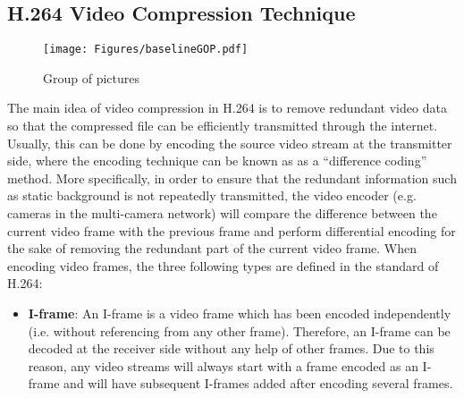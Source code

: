 {%
\subsection{H.264 Video Compression Technique}
\label{sec::H264CompressionIntro}
%
\begin{figure}
\begin{center}
\texttt{[image: Figures/baselineGOP.pdf]}
\caption{\label{fig::baselineGOP}Group of pictures}
\end{center}
\end{figure}
%
The main idea of video compression in H.264 is to remove redundant video data so that the compressed file can be efficiently transmitted through the internet.
Usually, this can be done by encoding the source video stream at the transmitter side, where the encoding technique can be known as as a ``difference coding'' method.
More specifically, in order to ensure that the redundant information such as static background is not repeatedly transmitted, the video encoder (e.g. cameras in the multi-camera network) will compare the difference between the current video frame with the previous frame and perform differential encoding for the sake of removing the redundant part of the current video frame.
When encoding video frames, the three following types are defined in the standard of H.264:
\begin{itemize}
\item \textbf{I-frame}:
An I-frame is a video frame which has been encoded independently (i.e. without referencing from any other frame).
Therefore, an I-frame can be decoded at the receiver side without any help of other frames.
Due to this reason, any video streams will always start with a frame encoded as an I-frame and will have subsequent I-frames added after encoding several frames.

\end{itemize}}
